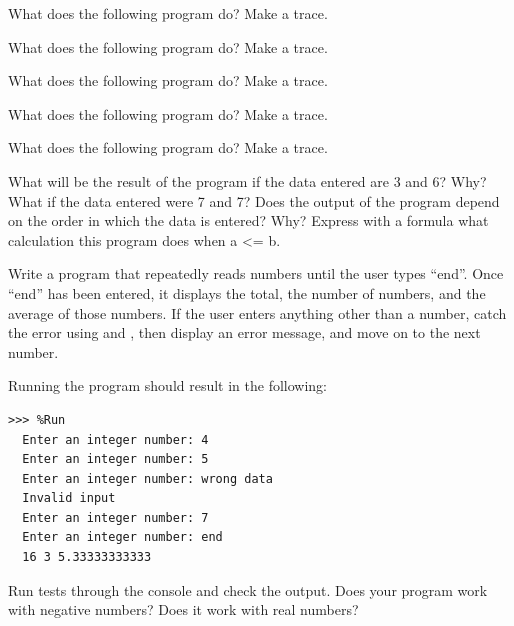 \begin{exercise}
What does the following program do? Make a trace.
\end{exercise}

\begin{exercise}
What does the following program do? Make a trace.
\end{exercise}

\begin{exercise}
What does the following program do? Make a trace.
\end{exercise}

\begin{exercise}
What does the following program do? Make a trace.
\end{exercise}

\begin{exercise}
What does the following program do? Make a trace.


What will be the result of the program if the data entered are 3 and 6? Why?
What if the data entered were 7 and 7?
Does the output of the program depend on the order in which the data is entered? Why?
Express with a formula what calculation this program does when a <= b.

\end{exercise}


\begin{exercise}

Write a program that repeatedly reads numbers until the user types ``end''. Once ``end'' has been entered, it displays the total, the number of numbers, and the average of those numbers. If the user enters anything other than a number, catch the error using  and , then display an error message, and move on to the next number.

Running the program should result in the following:

\begin{Verbatim}[frame=single, label={\em example test execution of the program}]
>>> %Run
  Enter an integer number: 4
  Enter an integer number: 5
  Enter an integer number: wrong data
  Invalid input
  Enter an integer number: 7
  Enter an integer number: end
  16 3 5.33333333333
\end{Verbatim}

Run tests through the console and check the output. Does your program work with negative numbers? Does it work with real numbers? 
\end{exercise}



